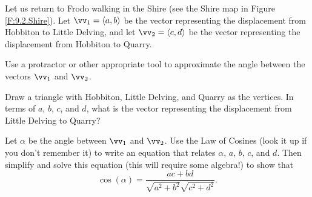 \begin{pa} \label{PA:9.3}
Let us return to Frodo walking in the Shire (see the Shire map in Figure \ref{F:9.2.Shire}). Let $\vv_1 = \langle a, b \rangle$ be the vector representing the displacement from Hobbiton to Little Delving, and let ${\vv_2 = \langle c,d \rangle}$ be the vector representing the displacement from Hobbiton to Quarry.
    \ba
    \item Use a protractor or  other appropriate tool to approximate the angle between the vectors $\vv_1$ and $\vv_2$.

\begin{comment}

Using a protractor, I found the angle between $\vv_1$ and $\vv_2$ to be approximately $150^{\circ}$.

\end{comment}

    \item Draw a triangle with Hobbiton, Little Delving, and Quarry as the vertices.  In terms of $a$, $b$, $c$, and $d$, what is the vector representing the displacement from Little Delving to Quarry?

\begin{comment}

The vector we want is $\vv_2 - \vv_1 = \langle c-a, d-b \rangle$.

\end{comment}

    \item Let $\alpha$ be the angle between $\vv_1$ and $\vv_2$. Use the Law of Cosines (look it up if you don't remember it) to write an equation that relates $\alpha$, $a$, $b$, $c$, and $d$. Then simplify and solve this equation (this will require some algebra!) to show that
\begin{equation} \label{eq:Shire_dot_product}
\cos(\alpha) = \frac{ac+bd}{\sqrt{a^2+b^2}\sqrt{c^2+d^2}}.
\end{equation}

\begin{comment}

\vs

\solution The distance from Hobbiton to Little Delving is $d_1=\sqrt{a^2+b^2}$ and the distance from Hobbiton to Quarry is $d_2=\sqrt{c^2+d^2}$. The distance from Hobbiton to Quarry is
\[ \sqrt{(c-a)^2 + (d-b)^2}.\]
Let $\alpha$ the angle between $\vv_1$ and $\vv_2$. The Law of Cosines states that
\[\left(\sqrt{(c-a)^2 + (d-b)^2}\right)^2 = d_1^2+d_2^2 - 2d_1d_2 \cos(\alpha).\]
So
\begin{align*}
(c-a)^2 + (d-b)^2 &= (a^2+b^2) + (c^2+d^2) - 2\sqrt{(a^2+b^2)(c^2+d^2)} \cos(\alpha) \\
(c^2-2ac+a^2) + (d^2-2bd+b^2) &= (a^2+b^2) + (c^2+d^2) - 2\sqrt{a^2+b^2}\sqrt{c^2+d^2} \cos(\alpha) \\
ac + bd &= \sqrt{a^2+b^2}\sqrt{c^2+d^2} \cos(\alpha) \\
\cos(\alpha) &= \frac{ac+bd}{\sqrt{a^2+b^2}\sqrt{c^2+d^2}}.
\end{align*}


\end{comment}
\end{pa}

